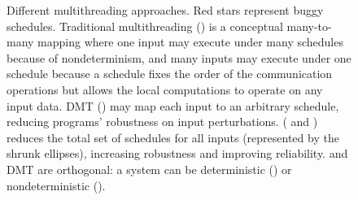 \begin{figure}[t]
\begin{center}
\vspace{-.05in}
\caption{Different multithreading approaches. Red stars represent buggy
  schedules.  Traditional multithreading ()
  is a conceptual many-to-many mapping where one input may execute under
  many schedules because of nondeterminism, and many inputs may execute
  under one schedule because a schedule fixes the order of the
  communication operations but allows the local computations to operate on
  any input data.  DMT () may map each input to an arbitrary
schedule, reducing programs' robustness on input perturbations.  \smt
( and
  ) reduces the total set of schedules for all inputs
  (represented by the shrunk ellipses), increasing robustness and improving
reliability.
  \smt and DMT are orthogonal: a \smt system can be deterministic
  () or nondeterministic ().}
\vspace{-.2in}
\end{center}
\end{figure}


